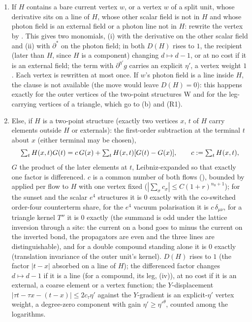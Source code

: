 \begin{definition}
\begin{enumerate}[label=\textup{(R\arabic*)},leftmargin=*]
\begin{enumerate}[label=\textup{(\alph*)},leftmargin=*]
\item If $H$ contains a bare current vertex $w$, or a vertex $w$ of a split unit, whose derivative sits on a line of $H$, whose other scalar field is not in $H$ and whose photon field is an external field or a photon line not in $H$: rewrite the vertex by . This gives two monomials, (i) with the derivative on the other scalar field and (ii) with $\partial^*$ on the photon field; in both $D(H)$ rises to $1$, the recipient (later than $H$, since $H$ is a component) changing $d\mapsto d-1$, or at no cost if it is an external field; the term with $\partial^{\eta'}g$ carries an explicit $\eta'$, a vertex weight $1$. Each vertex is rewritten at most once. If $w$'s photon field is a line inside $H$, the clause is not available (the move would leave $D(H)=0$): this happens exactly for the outer vertices of the two-point structures W and for the leg-carrying vertices of a triangle, which go to (b) and (R1).
\item Else, if $H$ is a two-point structure (exactly two vertices $x$, $t$ of $H$ carry elements outside $H$ or externals): the first-order subtraction at the terminal $t$ about $x$ (either terminal may be chosen),
\[
\textstyle\sum_tH(x,t)G(t)=c\,G(x)+\sum_tH(x,t)[G(t)-G(x)],\qquad c:=\sum_tH(x,t),
\]
$G$ the product of the later elements at $t$, Leibniz-expanded so that exactly one factor is differenced. $c$ is a common number of both flows (), bounded by  applied per flow to $H$ with one vertex fixed ($|\sum_\sigma c_\sigma|\le C(1+r)^{n_0+1}$); for the sunset and the scalar $e^4$ structures it is $0$ exactly with the co-switched order-four counterterm share, for the $e^4$ vacuum polarisation it is $c\,\delta_{\mu\nu}$, for a triangle kernel $T''$ it is $0$ exactly (the summand is odd under the lattice inversion through a site: the current on a bond goes to minus the current on the inverted bond, the propagators are even and the three lines are distinguishable), and for a double compound standing alone it is $0$ exactly (translation invariance of the outer unit's kernel). $D(H)$ rises to $1$ (the factor $|t-x|$ absorbed on a line of $H$); the differenced factor changes $d\mapsto d-1$ if it is a line (for a compound, its leg, (iv)), at no cost if it is an external, a coarse element or a vertex function; the $Y$-displacement $|\tau t-\tau x-(t-x)|\le2c_\tau\eta'$ against the $Y$-gradient is an explicit-$\eta'$ vertex weight, a degree-zero component with gain $\eta'\ge\eta'^\theta$, counted among the logarithms.

\end{enumerate}
\end{enumerate}
\end{definition}

